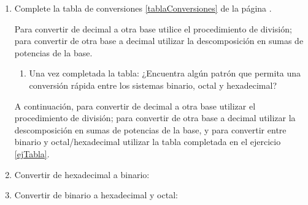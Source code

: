 \documentclass[12pt]{article}
\begin{document}
\begin{enumerate}[resume]

    \item Complete la tabla de conversiones \ref{tablaConversiones} de la
        página \pageref{tablaConversiones}. \label{ejTabla}

        Para convertir de decimal a otra base utilice el procedimiento de
        división; para convertir de otra base a decimal utilizar la
        descomposición en sumas de potencias de la base.

        \begin{enumerate}

            \item Una vez completada la tabla: ¿Encuentra algún patrón que
                permita una conversión rápida entre los sistemas binario,
                octal y hexadecimal?

        \end{enumerate}

        A continuación, para convertir de decimal a otra base utilizar el
        procedimiento de división; para convertir de otra base a decimal
        utilizar la descomposición en sumas de potencias de la base, y para
        convertir entre binario y octal/hexadecimal utilizar la tabla
        completada en el ejercicio \ref{ejTabla}.

    \item Convertir de hexadecimal a binario:


    \item Convertir de binario a hexadecimal y octal:

\end{enumerate}
\end{document}
